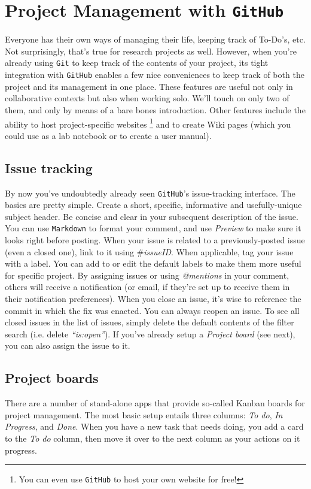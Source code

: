 \documentclass[12pt,letterpaper]{article}
\begin{document}
\section{Project Management with \texttt{GitHub}}
Everyone has their own ways of managing their life, keeping track of To-Do's, etc.
Not surprisingly, that's true for research projects as well.
However, when you're already using \texttt{Git} to keep track of the contents of 
your project, its tight integration with \texttt{GitHub} enables a few nice 
conveniences to keep track of both the project and its management in one 
place.
These features are useful not only in collaborative contexts but also when working solo.
We'll touch on only two of them, and only by means of a bare bones 
introduction.
Other features include the ability to host project-specific websites
\unskip
\footnote{You can even use \texttt{GitHub} to host your own website for free!}
 and to  create Wiki pages (which you could use as a lab notebook or to create 
 a user manual).


\subsection{Issue tracking}
By now you've undoubtedly already seen \texttt{GitHub}'s issue-tracking 
interface.
The basics are pretty simple.
Create a short, specific, informative and usefully-unique subject header.
Be concise and clear in your subsequent description of the issue.
You can use \texttt{Markdown} to format your comment, and use \emph{Preview} to make sure it looks right before posting.
When your issue is related to a previously-posted issue (even a closed one), link to it using \emph{$\#$issueID}.
When applicable, tag your issue with a label.
You can add to or edit the default labels to make them more useful for specific project.
By assigning issues or using \emph{@mentions} in your comment, others will 
receive a notification
(or email, if they're set up to receive them in their notification preferences).
When you close an issue, it's wise to reference the commit in which the fix was enacted.
You can always reopen an issue.
To see all closed issues in the list of issues, 
simply delete the default contents of the filter search
(i.e. delete \emph{``is:open''}).
If you've already setup a \emph{Project board} (see next), 
you can also assign the issue to it.


\subsection{Project boards}
There are a number of stand-alone apps that provide so-called Kanban boards for project management.
The most basic setup entails three columns:
\emph{To do}, \emph{In Progress}, and \emph{Done}.
When you have a new task that needs doing, you add a card to the
\emph{To do} column, 
then move it over to the next column as your actions on it progress.
\end{document}
